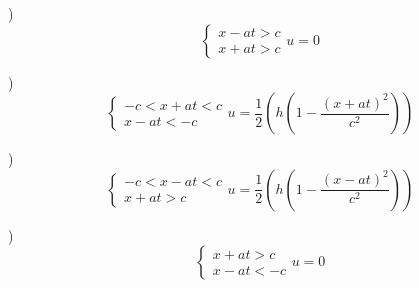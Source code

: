 \documentclass[a4paper]{article}
\begin{document}
)
\[
    \begin{cases}
        x - at > c\\
        x + at > c
    \end{cases}
    u = 0
\]

)
\[
    \begin{cases}
        -c < x + at < c\\
        x - at < -c
    \end{cases}
    u = \frac{1}{2} \left( h \left(1 - \frac{(x+at)^2}{c^2} \right) \right)
\]

)
\[
    \begin{cases}
        -c < x - at < c\\
        x + at > c
    \end{cases}
    u = \frac{1}{2} \left( h \left(1 - \frac{(x-at)^2}{c^2} \right) \right)
\]

)
\[
    \begin{cases}
        x + at > c\\
        x - at < -c
    \end{cases}
    u = 0
\]
\end{document}
